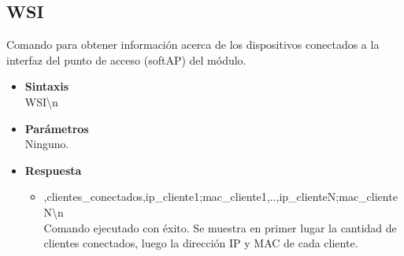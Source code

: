 \documentclass[a4paper,spanish]{article}
\begin{document}
\subsection{WSI}
Comando para obtener información acerca de los dispositivos conectados a la interfaz del punto de acceso (softAP) del módulo.
\begin{itemize}
	\item \textbf{Sintaxis}\\
	{\ttfamily WSI\textbackslash n}
	\item \textbf{Parámetros}\\
	Ninguno.
	\item \textbf{Respuesta}
	\begin{itemize}
		\item{,clientes\_conectados,ip\_cliente1;mac\_cliente1,..,ip\_clienteN;mac\_clienteN\textbackslash n}\\
		Comando ejecutado con éxito. Se muestra en primer lugar la cantidad de clientes conectados, luego la dirección IP y MAC de cada cliente.
	\end{itemize}
\end{itemize}
\end{document}
